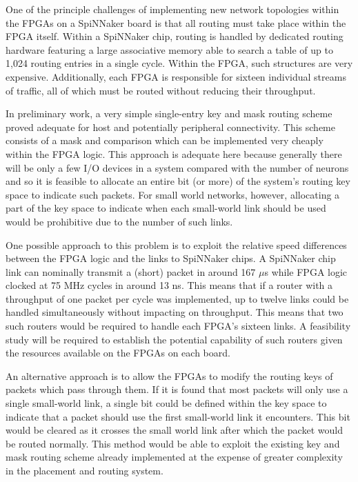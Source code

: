 			One of the principle challenges of implementing new network topologies
			within the FPGAs on a SpiNNaker board is that all routing must take place
			within the FPGA itself. Within a SpiNNaker chip, routing is handled by
			dedicated routing hardware featuring a large associative memory able to
			search a table of up to 1,024 routing entries in a single cycle. Within
			the FPGA, such structures are very expensive. Additionally, each FPGA is
			responsible for sixteen individual streams of traffic, all of which must
			be routed without reducing their throughput.
			
			In preliminary work, a very simple single-entry key and mask routing
			scheme proved adequate for host and potentially peripheral connectivity.
			This scheme consists of a mask and comparison which can be implemented
			very cheaply within the FPGA logic.  This approach is adequate here
			because generally there will be only a few I/O devices in a system
			compared with the number of neurons and so it is feasible to allocate an
			entire bit (or more) of the system's routing key space to indicate such
			packets.  For small world networks, however, allocating a part of the key
			space to indicate when each small-world link should be used would be
			prohibitive due to the number of such links.
			
			One possible approach to this problem is to exploit the relative speed
			differences between the FPGA logic and the links to SpiNNaker chips. A
			SpiNNaker chip link can nominally transmit a (short) packet in around 167
			$\mu$s while FPGA logic clocked at 75 MHz cycles in around 13 ns. This
			means that if a router with a throughput of one packet per cycle was
			implemented, up to twelve links could be handled simultaneously without
			impacting on throughput. This means that two such routers would be
			required to handle each FPGA's sixteen links. A feasibility study will be
			required to establish the potential capability of such routers given the
			resources available on the FPGAs on each board.
			
			An alternative approach is to allow the FPGAs to modify the routing keys
			of packets which pass through them. If it is found that most packets will
			only use a single small-world link, a single bit could be defined within
			the key space to indicate that a packet should use the first small-world
			link it encounters. This bit would be cleared as it crosses the small
			world link after which the packet would be routed normally. This method
			would be able to exploit the existing key and mask routing scheme already
			implemented at the expense of greater complexity in the placement and
			routing system.
			
